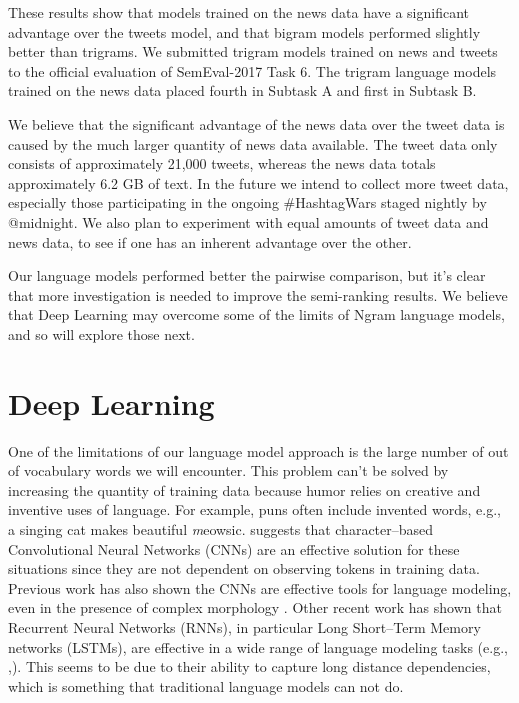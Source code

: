 \documentclass[11pt,a4paper]{article}
\begin{document}
These results show that models trained on the news data
have a significant advantage over the tweets model, and that bigram
models performed slightly better than trigrams. We submitted
trigram models trained on news and tweets to the official evaluation 
of SemEval-2017 Task 6. The trigram language models trained on
the news data placed fourth in Subtask A and first in Subtask B.

We believe that the significant advantage of the news data over 
the tweet data is caused by the much larger quantity of news data
available. The tweet data only consists of approximately 21,000 tweets,
whereas the news data totals approximately 6.2 GB of text.
In the future we intend to collect more tweet data, especially those 
participating in the ongoing \#HashtagWars staged nightly by @midnight. 
We also plan to experiment with equal amounts of tweet data and
news data, to see if one has an inherent advantage over the other.

Our language models performed better the pairwise comparison, 
but it's clear that more investigation is needed to improve
the semi-ranking results. 
We believe that Deep Learning
may overcome some of the limits of Ngram language models, and so
will explore those next. 
\section{Deep Learning}

One of the limitations of our language model approach  
is the large number of out of vocabulary 
words we will encounter. This problem can't be solved
by increasing the quantity of training data because
humor relies on creative and inventive 
uses of language. For example, puns often include
invented words, e.g., a singing cat makes beautiful {\textit meowsic}.  
\cite{PotashRR17} suggests that character--based 
Convolutional Neural Networks (CNNs) are
an effective solution for these situations since they are not
dependent on observing tokens in training data.
Previous work
has also shown the CNNs are effective tools for
language modeling, even in the presence of complex morphology 
\cite{KimJSR15}. Other recent work has shown that Recurrent
Neural Networks (RNNs), in particular Long Short--Term Memory
networks (LSTMs), are effective in a wide range of language
modeling tasks (e.g., \cite{SundermeyerSN12},\cite{SundermeyeNS15}). 
This seems to be due to their ability to capture
long distance dependencies, which is something that traditional language
models can not do. 
\end{document}

